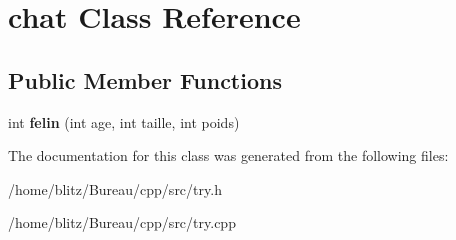 \hypertarget{classchat}{}\section{chat Class Reference}
\label{classchat}
\subsection*{Public Member Functions}
\begin{DoxyCompactItemize}
\item 
\mbox{\label{classchat_adde861fd5a3610aed10324e331a7229b}} 
int {\bfseries felin} (int age, int taille, int poids)
\end{DoxyCompactItemize}


The documentation for this class was generated from the following files\+:\begin{DoxyCompactItemize}
\item 
/home/blitz/\+Bureau/cpp/src/try.\+h\item 
/home/blitz/\+Bureau/cpp/src/try.\+cpp\end{DoxyCompactItemize}
